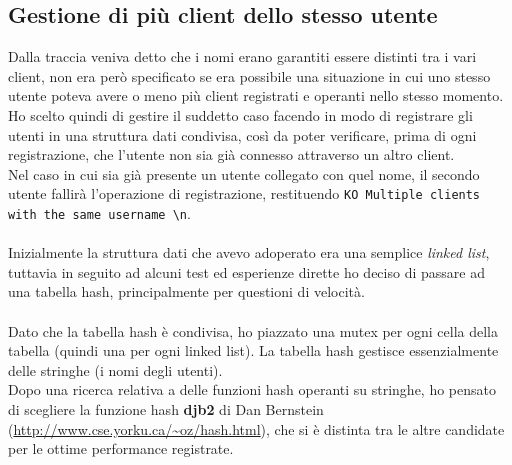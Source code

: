 \subsection{Gestione di più client dello stesso utente}
\begin{flushleft}

Dalla traccia veniva detto che i nomi erano garantiti essere distinti tra i vari client, non era però specificato se era possibile una situazione in cui uno stesso utente poteva avere o meno più client registrati e operanti nello stesso momento.\\

Ho scelto quindi di gestire il suddetto caso facendo in modo di registrare gli utenti in una struttura dati condivisa, così da poter verificare, prima di ogni registrazione, che l'utente non sia già connesso attraverso un altro client.\\

Nel caso in cui sia già presente un utente collegato con quel nome, il secondo utente fallirà l'operazione di registrazione, restituendo \texttt{KO Multiple clients with the same username \textbackslash n}.\\~\\
Inizialmente la struttura dati che avevo adoperato era una semplice \emph{linked list}, tuttavia in seguito ad alcuni test ed esperienze dirette ho deciso di passare ad una tabella hash, principalmente per questioni di velocità. 
\\~\\
Dato che la tabella hash è condivisa, ho piazzato una mutex per ogni cella della tabella (quindi una per ogni linked list).
La tabella hash gestisce essenzialmente delle stringhe (i nomi degli utenti).\\ Dopo una ricerca relativa a delle funzioni hash operanti su stringhe, ho pensato di scegliere la funzione hash \textbf{djb2} di Dan Bernstein (\url{http://www.cse.yorku.ca/~oz/hash.html}), che si è distinta tra le altre candidate per le ottime performance registrate.
 

\end{flushleft}

\newpage

